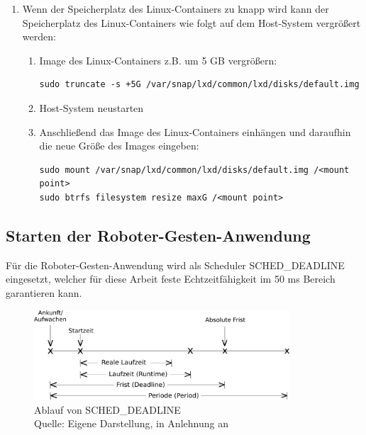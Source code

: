 \begin{enumerate}[label*=\arabic*.]
        \item Wenn der Speicherplatz des Linux-Containers zu knapp wird kann der Speicherplatz des Linux-Containers wie folgt auf dem Host-System vergrößert werden:
            \begin{enumerate}[label*=\arabic*.]
                \item Image des Linux-Containers z.B. um 5 GB vergrößern:
                    \begin{lstlisting}[style=bash]
sudo truncate -s +5G /var/snap/lxd/common/lxd/disks/default.img
                    \end{lstlisting}

                \item Host-System neustarten

                \item Anschließend das Image des Linux-Containers einhängen und daraufhin die neue Größe des Images eingeben:
                    \begin{lstlisting}[style=bash]
sudo mount /var/snap/lxd/common/lxd/disks/default.img /<mount point>
sudo btrfs filesystem resize maxG /<mount point>
                    \end{lstlisting}
            \end{enumerate}
\end{enumerate}


\subsection{Starten der Roboter-Gesten-Anwendung}
Für die Roboter-Gesten-Anwendung wird als Scheduler SCHED\_DEADLINE eingesetzt, welcher für diese Arbeit feste Echtzeitfähigkeit im 50 ms Bereich garantieren kann.

\begin{figure}[htb]
	\centering
	\includegraphics[width=0.85\textwidth]{images/anhang/sched_deadline}
	\caption[Ablauf von SCHED\_DEADLINE]{Ablauf von SCHED\_DEADLINE\\Quelle: Eigene Darstellung, in Anlehnung an \cite{man_sched7_nodate}}
	\label{fig:sched_deadline}
\end{figure}
\FloatBarrier

